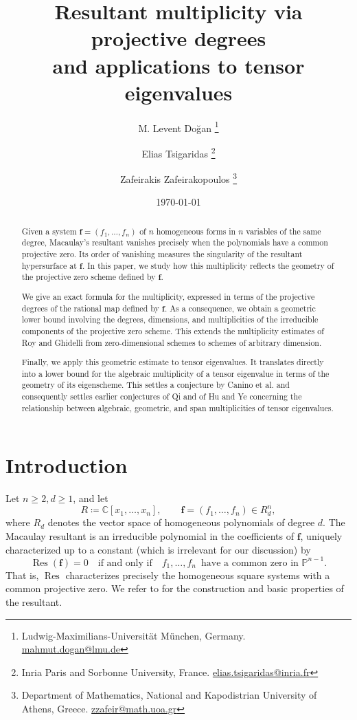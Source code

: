 \documentclass[11pt,letterpaper]{article}
\title{Resultant multiplicity via projective degrees\\ and applications to tensor eigenvalues}
\author{
M. Levent Do\u{g}an 
\thanks{Ludwig-Maximilians-Universit\"{a}t M\"{u}nchen, Germany. \url{mahmut.dogan@lmu.de} }
\and 
Elias Tsigaridas 
\thanks{Inria Paris and Sorbonne University, France.
\url{elias.tsigaridas@inria.fr}
}
\and 
Zafeirakis Zafeirakopoulos \thanks{Department of Mathematics, National and Kapodistrian University of Athens, Greece. \url{zzafeir@math.uoa.gr}}}
\date{\small\today}
\numberwithin{equation}{section}
\newcommand{\PP}{\mathbb{P}}
\newcommand{\CC}{\mathbb{C}}
\newcommand{\ff}{\ensuremath{\boldsymbol{f}}}
\DeclareMathOperator{\Res}{Res}
\begin{document}
\maketitle

\begin{abstract}
Given a system $\ff=(f_1,\ldots,f_n)$ of $n$ homogeneous forms in $n$ variables of the same degree, Macaulay's resultant vanishes precisely when the polynomials have a common projective zero.
Its order of vanishing measures the singularity of the resultant hypersurface at $\ff$.
In this paper, we study how this multiplicity reflects the geometry of the projective zero scheme defined by $\ff$.

We give an exact formula for the multiplicity, expressed in terms of the projective degrees of the rational map defined by $\ff$.
As a consequence, we obtain a geometric lower bound involving the degrees, dimensions, and multiplicities of the irreducible components of the projective zero scheme.
This extends the multiplicity estimates of Roy and Ghidelli from zero-dimensional schemes to schemes of arbitrary dimension.

Finally, we apply this geometric estimate to tensor eigenvalues.
It translates directly into a lower bound for the algebraic multiplicity of a tensor eigenvalue in terms of the geometry of its eigenscheme.
This settles a conjecture by Canino et al. and consequently settles earlier conjectures of Qi and of Hu and Ye concerning the relationship between algebraic, geometric, and span multiplicities of tensor eigenvalues. 
\end{abstract}

\tableofcontents

\section{Introduction}

Let $n\geq 2, d\geq 1$, and let \[
R\coloneqq \CC[x_1,\ldots,x_n],\qquad \ff=(f_1,\dots,f_n)\in R_d^n,
\] 
where $R_{d}$ denotes the vector space of homogeneous polynomials of degree $d$.
The Macaulay resultant \cite{Macaulay-02,Macaulay-16} is an irreducible polynomial in the coefficients of $\ff$, uniquely characterized up to a constant (which is irrelevant for our discussion) by \[
\Res(\ff)=0 \quad\text{if and only if}\quad f_1,\ldots, f_n \,\text{ have a common zero in }\PP^{n-1}.
\] That is, $\Res$ characterizes precisely the homogeneous square systems with a common projective zero.
We refer to \cite{Jouanolou-91,Cox-Little-Oshea-05,GKZ-08} for the construction and basic properties of the resultant.
\end{document}
